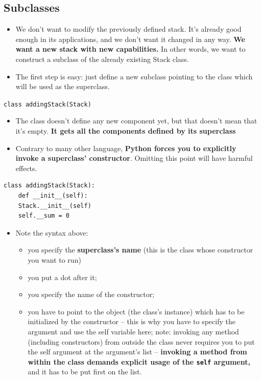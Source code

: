 \documentclass[11pt]{article}
\begin{document}
\subsection{Subclasses}
\label{sec:orgcac9b83}
\begin{itemize}
\item We don’t want to modify the previously defined stack. It’s already
good enough in its applications, and we don’t want it changed in any
way. \textbf{We want a new stack with new capabilities.} In other words, we
want to construct a subclass of the already existing Stack class.
\item The first step is easy: just define a new subclass pointing to the
class which will be used as the superclass.
\end{itemize}

\texttt{class addingStack(Stack)}

\begin{itemize}
\item The class doesn’t define any new component yet, but that doesn’t
mean that it’s empty. \textbf{It gets all the components defined by its
superclass}

\item Contrary to many other language, \textbf{Python forces you to explicitly
invoke a superclass’ constructor}. Omitting this point will have
harmful effects.
\end{itemize}

\begin{verbatim}
class addingStack(Stack):
    def __init__(self):
	Stack.__init__(self)
	self.__sum = 0 
\end{verbatim}

\begin{itemize}
\item Note the syntax above:
\begin{itemize}
\item you specify the \textbf{superclass’s name} (this is the class whose
constructor you want to run)
\item you put a dot after it;
\item you specify the name of the constructor;
\item you have to point to the object (the class’s instance) which has
to be initialized by the constructor – this is why you have to
specify the argument and use the self variable here; note:
invoking any method (including constructors) from outside the
class never requires you to put the self argument at the
argument’s list – \textbf{invoking a method from within the class demands
explicit usage of the \texttt{self} argument,} and it has to be put first
on the list.
\end{itemize}
\end{itemize}
\end{document}
